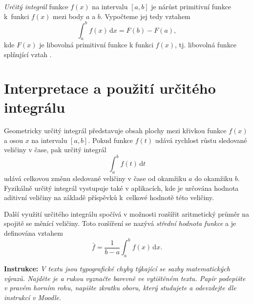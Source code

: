 \documentclass[11pt, reqno]{amsart}
\begin{document}
{\itshape Určitý integrál} funkce $f(x)$ na intervalu $[a, b]$ je nárůst primitivní funkce 
k~funkci $f(x)$ mezi body $a$ a $b$. Vypočteme jej tedy vztahem
\[\int_a^b f(x) \,\mathrm dx = F(b) - F(a),\tag{2}\] kde $F(x)$ je libovolná primitivní funkce k funkci $f(x)$, tj. libovolná funkce splňující vztah .

\section*{Interpretace a použití určitého integrálu}

Geometricky určitý integrál  představuje obsah plochy mezi křivkou funkce $f(x)$ a osou $x$ na intervalu $[a, b]$. Pokud funkce $f(t)$ udává rychlost růstu sledované veličiny v čase, pak určitý integrál 
\[\int_a^b f(t) \,\mathrm dt\]
udává celkovou změnu sledované veličiny v čase od okamžiku $a$ do okamžiku $b$. 
Fyzikálně určitý integrál vystupuje také v aplikacích, kde 
je určována hodnota aditivní veličiny na základě příspěvků k~celkové hodnotě této veličiny.

Další využití určitého integrálu spočívá v možnosti rozšířit aritmetický průměr na 
spojitě se měnící veličiny. Toto rozšíření se nazývá 
\emph{střední hodnota funkce} a je definována vztahem
\[\bar{f} = \frac{1}{b-a} \int_a^b f(x) \,\mathrm dx.\]




\vfill
{\bfseries Instrukce:} \itshape V textu jsou typografické chyby týkající se sazby matematických výrazů. 
Najděte je a rukou vyznačte barevně ve vytištěném textu. Papír podepište v pravém horním rohu, napište zkratku 
oboru, který studujete
a odevzdejte dle instrukcí v Moodle.  
\end{document}

